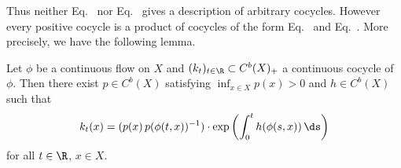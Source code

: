 Thus neither Eq.~ nor Eq.~ gives a description of arbitrary cocycles.
However every positive cocycle is a product of cocycles of the form Eq.~ and Eq.~.
More precisely, we have the following lemma.
\begin{lemma}\label{lem:b2-3.12}
Let $\phi$ be a continuous flow on $X$ and $(k_{t})_{t \in \R} \subset C^{b}(X)_{+}$ a continuous cocycle of\/ $\phi$.
Then there exist $p \in C^{b}(X)$ satisfying $\inf_{x \in X} p(x) > 0$ and $h \in C^{b}(X)$ such that
\begin{equation}\label{eq:b2-3.15}
k_{t}(x) = ( p(x) \, p(\phi(t,x))^{-1} ) \cdot \exp\left(\int_{0}^{t} h(\phi(s,x))\, \ds\right)
\end{equation}
for all $t \in \R$, $x \in X$.
\end{lemma}

